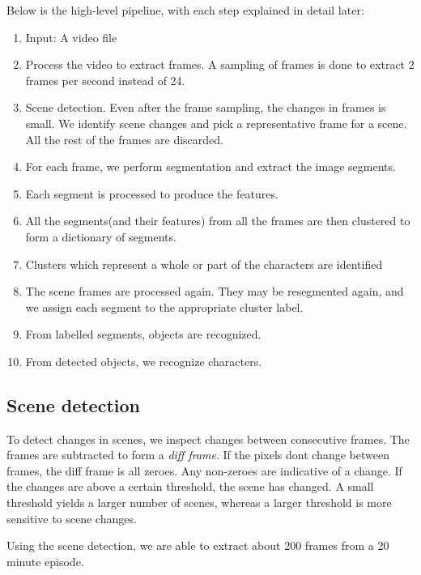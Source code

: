 \documentclass[10pt,twocolumn,letterpaper]{article}
\begin{document}
Below is the high-level pipeline, with each step explained in detail
later:
\begin{enumerate}
\item Input: A video file
\item Process the video to extract frames. A sampling of frames is
  done to extract 2 frames per second instead of 24.
\item Scene detection. Even after the frame sampling, the changes in
  frames is small. We identify scene changes and pick a representative
  frame for a scene. All the rest of the frames are discarded. 
\item For each frame, we perform segmentation and extract the image segments.
\item Each segment is processed to produce the features.
\item All the segments(and their features) from all the frames are
  then clustered to form a dictionary of segments.
\item Clusters which represent a whole or part of the characters are identified
\item The scene frames are processed again. They may be resegmented
  again, and we assign each segment to the appropriate cluster label. 
\item From labelled segments, objects are recognized.
\item From detected objects, we recognize characters. 
\end{enumerate}

\subsection{Scene detection}
To detect changes in scenes, we inspect changes between consecutive
frames. The frames are subtracted to form a \emph{diff frame}. If the
pixels dont change between frames, the diff frame is all zeroes. Any
non-zeroes are indicative of a change. If the changes are above a
certain threshold, the scene has changed. A small threshold yields a
larger number of scenes, whereas a larger threshold is more sensitive
to scene changes. 

Using the scene detection, we are able to extract about 200 frames
from a 20 minute episode. 
\end{document}
